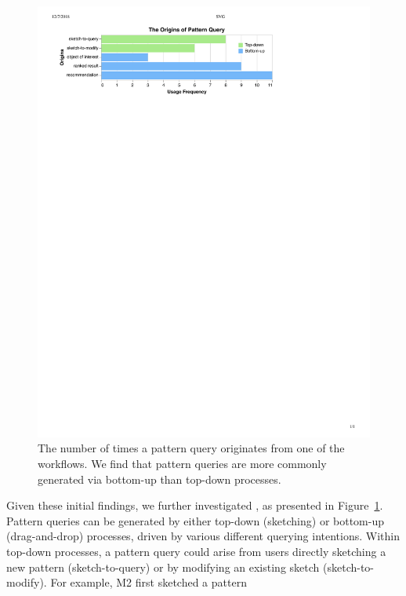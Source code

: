 \begin{figure}[h!]
  \includegraphics[width=0.95\linewidth]{figures/the_origins_of_sketch.pdf}
  \vspace{-5pt}
  \caption{The number of times a pattern query originates from one of the workflows. We find that pattern queries are  more commonly generated via bottom-up than top-down processes.}\label{fig:origins_of_sketch}
  \vspace{-5pt}
\end{figure}
\par Given these initial findings,
we further investigated , as presented in Figure~\ref{fig:origins_of_sketch}.
Pattern queries can be generated by
either top-down (sketching) or
bottom-up (drag-and-drop) processes,
driven by various different querying intentions.
Within top-down processes,
a pattern query could arise
from users directly sketching
a new pattern (sketch-to-query)
or by modifying an existing sketch (sketch-to-modify). For example, M2 first sketched a pattern

